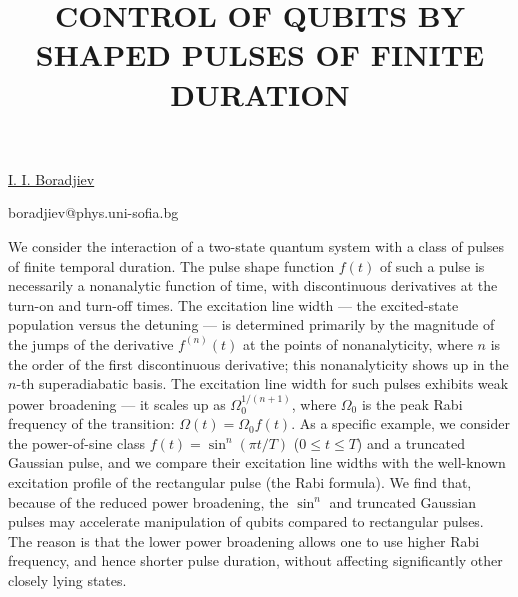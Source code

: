 \title{CONTROL OF QUBITS BY SHAPED PULSES OF FINITE DURATION}

\underline{I. I. Boradjiev} 

{\normalsize{\vspace{-4mm}

\unisofia

\email boradjiev@phys.uni-sofia.bg}}

We consider the interaction of a two-state quantum system with a class of pulses of finite temporal duration.
The pulse shape function $f(t)$ of such a pulse is necessarily a nonanalytic function of time, with discontinuous derivatives at the turn-on and turn-off times.
The excitation line width --- the excited-state population versus the detuning --- is determined primarily by the magnitude of the jumps of the derivative $f^{(n)}(t)$ at the points of nonanalyticity, where $n$ is the order of the first discontinuous derivative; this nonanalyticity shows up in the $n$-th superadiabatic basis.
The excitation line width for such pulses exhibits weak power broadening --- it scales up as $\Omega_0^{1/(n+1)}$, where $\Omega_0$ is the peak Rabi frequency of the transition: $\Omega(t)=\Omega_0 f(t)$.
As a specific example, we consider the power-of-sine class $f(t) = \sin^n(\pi t/T)$ ($0\leqslant t \leqslant T$) and a truncated Gaussian pulse, and we compare their excitation line widths with the well-known excitation profile of the rectangular pulse (the Rabi formula).
We find that, because of the reduced power broadening, the $\sin^n$ and truncated Gaussian pulses may accelerate manipulation of qubits compared to rectangular pulses.
The reason is that the lower power broadening allows one to use higher Rabi frequency, and hence shorter pulse duration, without affecting significantly other closely lying states.

\vspace{\baselineskip}
